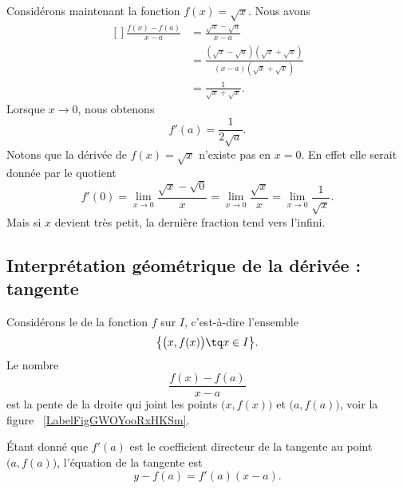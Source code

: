 Considérons maintenant la fonction $f(x)=\sqrt{x}$. Nous avons
\begin{equation}
	\begin{aligned}[]
		\frac{ f(x)-f(a) }{ x-a }&=\frac{ \sqrt{x}-\sqrt{a} }{ x-a }\\
		&=\frac{ (\sqrt{x}-\sqrt{a})(\sqrt{x}+\sqrt{x}) }{ (x-a)(\sqrt{x}+\sqrt{x}) }\\
		&=\frac{1}{ \sqrt{x}+\sqrt{x} }.
	\end{aligned}
\end{equation}
Lorsque $x\to 0$, nous obtenons
\begin{equation}
	f'(a)=\frac{1}{ 2\sqrt{a} }.
\end{equation}
Notons que la dérivée de $f(x)=\sqrt{x}$ n'existe pas en $x=0$. En effet elle serait donnée par le quotient
\begin{equation}
	f'(0)=\lim_{x\to 0} \frac{ \sqrt{x}-\sqrt{0} }{ x }=\lim_{x\to 0} \frac{ \sqrt{x} }{ x }=\lim_{x\to 0} \frac{1}{ \sqrt{x} }.
\end{equation}
Mais si $x$ devient très petit, la dernière fraction tend vers l'infini.

\subsection[Interprétation géométrique : tangente]{Interprétation géométrique de la dérivée : tangente}

Considérons le  de la fonction $f$ sur $I$, c'est-à-dire l'ensemble
\begin{equation}
	\big\{ \big( x,f(x) \big)\tq x\in I \big\}.
\end{equation}
Le nombre
\begin{equation}
	\frac{ f(x)-f(a) }{ x-a }
\end{equation}
est la pente de la droite qui joint les points $\big( x,f(x) \big)$ et $\big( a,f(a) \big)$, voir la figure ~\ref{LabelFigGWOYooRxHKSm}. %
\newcommand{\CaptionFigGWOYooRxHKSm}{Le coefficient directeur de la corde entre $a$ et $x$.}


Étant donné que $f'(a)$ est le coefficient directeur de la tangente au point $\big( a,f(a) \big)$, l'équation de la tangente est
\begin{equation}		\label{EqTgfaen}
	y-f(a)=f'(a)(x-a).
\end{equation}

